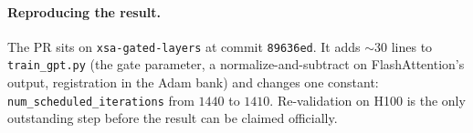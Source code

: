 \documentclass[10pt,letterpaper]{article}
\newcommand{\code}[1]{\texttt{\small #1}}
\begin{document}
\paragraph{Reproducing the result.} The PR sits on \code{xsa-gated-layers} at commit \code{89636ed}. It adds $\sim$30 lines to \code{train\_gpt.py} (the gate parameter, a normalize-and-subtract on FlashAttention's output, registration in the Adam bank) and changes one constant: \code{num\_scheduled\_iterations} from $1440$ to $1410$. Re-validation on H100 is the only outstanding step before the result can be claimed officially.

\printbibliography[heading=bibintoc,title={References}]
\end{document}
